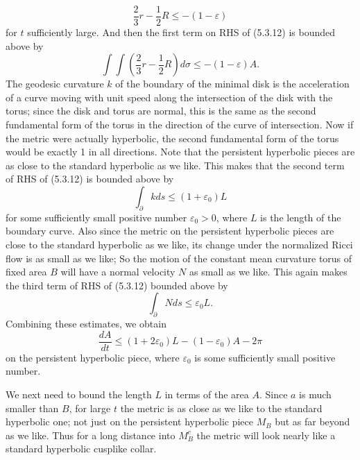 $$
\frac{2}{3}r-\frac{1}{2}R\leq -(1-\varepsilon)
$$
for $t$ sufficiently large. And then the first term on RHS of
(5.3.12) is bounded above by
$$
\int\int \left(\frac{2}{3}r-\frac{1}{2}R\right)d\sigma\leq
-(1-\varepsilon)A.
$$
The geodesic curvature $k$ of the boundary of the minimal disk is
the acceleration of a curve moving with unit speed along the
intersection of the disk with the torus; since the disk and torus
are normal, this is the same as the second fundamental form of the
torus in the direction of the curve of intersection. Now if the
metric were actually hyperbolic, the second fundamental form of
the torus would be exactly 1 in all directions. Note that the
persistent hyperbolic pieces are as close to the standard
hyperbolic as we like. This makes that the second term of RHS of
(5.3.12) is bounded above by
$$
\int_\partial kds\leq(1+\varepsilon_0)L
$$
for some sufficiently small positive number $\varepsilon_0>0$,
where $L$ is the length of the boundary curve. Also since the
metric on the persistent hyperbolic pieces are close to the
standard hyperbolic as we like, its change under the normalized
Ricci flow is as small as we like; So the motion of the constant
mean curvature torus of fixed area $B$ will have a normal velocity
$N$ as small as we like. This again makes the third term of RHS of
(5.3.12) bounded above by
$$
\int_\partial Nds\leq \varepsilon_0 L.
$$
Combining these estimates, we obtain \begin{equation}
\frac{dA}{dt}\leq(1+2\varepsilon_0)L-(1-\varepsilon_0)A-2\pi
\end{equation} on the persistent hyperbolic piece, where $\varepsilon_0$ is
some sufficiently small positive number.

We next need to bound the length $L$ in terms of the area $A$.
Since $a$ is much smaller than $B$, for large $t$ the metric is as
close as we like to the standard hyperbolic one; not just on the
persistent hyperbolic piece $M_B$ but as far beyond as we like.
Thus for a long distance into $M_B^c$ the metric will look nearly
like a standard hyperbolic cusplike collar.

